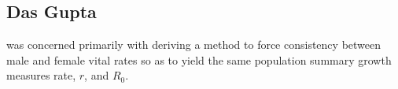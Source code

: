 
\subsection{Das Gupta}

\citet{gupta1972two, gupta1973growth, gupta1976interactive, gupta1978alternative}
was concerned primarily with deriving a method to force consistency between male and female
vital rates so as to yield the same population summary growth measures rate,
$r$, and $R_0$.

